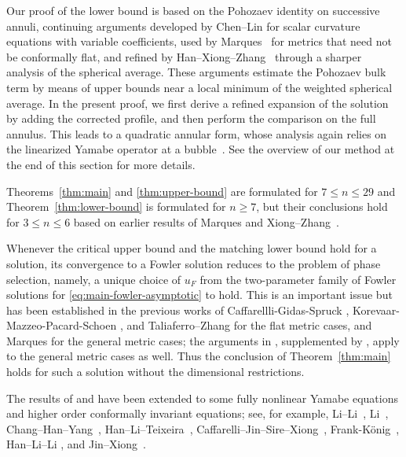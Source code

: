 \documentclass[11pt]{article}
\numberwithin{equation}{section}
\theoremstyle{remark}
\begin{document}
Our proof of the lower bound is based on the Pohozaev identity on
successive annuli, continuing arguments developed by Chen--Lin
\cite{ChenLin1999} for scalar curvature equations with variable
coefficients, used by Marques~\cite{f-mar} for metrics that need not be
conformally flat, and refined by Han--Xiong--Zhang~\cite[Proposition~5.3 and
Section~6]{HanXiongZhang} through a sharper analysis of the spherical
average. These arguments estimate the Pohozaev bulk term by means of upper
bounds near a local minimum of the weighted spherical average.  In the present proof, we first derive a refined expansion of the solution
by adding the corrected profile, and then perform the comparison on the
full annulus. This leads to a quadratic annular form, whose analysis again
relies on the linearized Yamabe operator at a bubble~\cite{KMS}. See  the overview of our method at the end of this section for more details.

Theorems~\ref{thm:main} and \ref{thm:upper-bound} are formulated for $7\le n\le29$ and  Theorem~\ref{thm:lower-bound} is formulated for $n\ge 7$, but their conclusions hold for $3\le n\le 6$ based on earlier results of Marques \cite{f-mar} and 
Xiong--Zhang~\cite{x-z-1}.

Whenever the critical upper bound and the matching lower bound hold for a solution, its convergence to a Fowler solution reduces to the problem of phase
selection, namely, a unique choice of $u_F$ from the two-parameter family of Fowler solutions for \eqref{eq:main-fowler-asymptotic} to hold. This is an important issue but has been established in the
previous works of Caffarellli-Gidas-Spruck \cite{CGS}, Korevaar-Mazzeo-Pacard-Schoen \cite{KMPS},  and Taliaferro--Zhang \cite{TZ} for the flat metric cases,  and Marques \cite{f-mar} for the general metric cases; the arguments in \cite{TZ}, supplemented by \mbox{\cite[Theorem  3]{HanLiTeixeira}}, apply to the general metric cases as well. Thus the conclusion of Theorem~\ref{thm:main} holds for such a solution without the dimensional restrictions.


The results of \cite{CGS} and \cite{KMPS} have been extended to some
fully nonlinear Yamabe equations and higher order conformally invariant
equations; see, for example, Li--Li~\cite{LiLi2003},
Li~\cite{Li2006}, Chang--Han--Yang~\cite{CHY2005,CHY2020},  
Han--Li--Teixeira~\cite{HanLiTeixeira}, 
Caffarelli--Jin--Sire--Xiong~\cite{CJSX2014}, Frank-König~\cite{FK2019},
Han--Li--Li \cite{HLL}, and Jin--Xiong~\cite{JX2021}.
\end{document}
